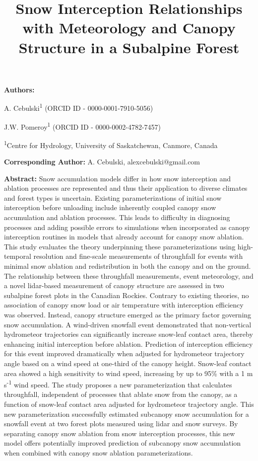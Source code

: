 \documentclass[
  letterpaper,
  DIV=11,
  numbers=noendperiod]{scrartcl}
\title{Snow Interception Relationships with Meteorology and Canopy
Structure in a Subalpine Forest}
\author{}
\date{}
\begin{document}
\maketitle



\textbf{Authors:}

A. Cebulski\textsuperscript{1} (ORCID ID - 0000-0001-7910-5056)

J.W. Pomeroy\textsuperscript{1} (ORCID ID - 0000-0002-4782-7457)

\textsuperscript{1}Centre for Hydrology, University of Saskatchewan,
Canmore, Canada

\textbf{Corresponding Author:} A. Cebulski, alexcebulski@gmail.com

\textbf{Abstract:} Snow accumulation models differ in how snow
interception and ablation processes are represented and thus their
application to diverse climates and forest types is uncertain. Existing
parameterizations of initial snow interception before unloading include
inherently coupled canopy snow accumulation and ablation processes. This
leads to difficulty in diagnosing processes and adding possible errors
to simulations when incorporated as canopy interception routines in
models that already account for canopy snow ablation. This study
evaluates the theory underpinning these parameterizations using
high-temporal resolution and fine-scale measurements of throughfall for
events with minimal snow ablation and redistribution in both the canopy
and on the ground. The relationship between these throughfall
measurements, event meteorology, and a novel lidar-based measurement of
canopy structure are assessed in two subalpine forest plots in the
Canadian Rockies. Contrary to existing theories, no association of
canopy snow load or air temperature with interception efficiency was
observed. Instead, canopy structure emerged as the primary factor
governing snow accumulation. A wind-driven snowfall event demonstrated
that non-vertical hydrometeor trajectories can significantly increase
snow-leaf contact area, thereby enhancing initial interception before
ablation. Prediction of interception efficiency for this event improved
dramatically when adjusted for hydrometeor trajectory angle based on a
wind speed at one-third of the canopy height. Snow-leaf contact area
showed a high sensitivity to wind speed, increasing by up to 95\% with a
1 m s\textsuperscript{-1} wind speed. The study proposes a new
parameterization that calculates throughfall, independent of processes
that ablate snow from the canopy, as a function of snow-leaf contact
area adjusted for hydrometeor trajectory angle. This new
parameterization successfully estimated subcanopy snow accumulation for
a snowfall event at two forest plots measured using lidar and snow
surveys. By separating canopy snow ablation from snow interception
processes, this new model offers potentially improved prediction of
subcanopy snow accumulation when combined with canopy snow ablation
parameterizations.
\end{document}
